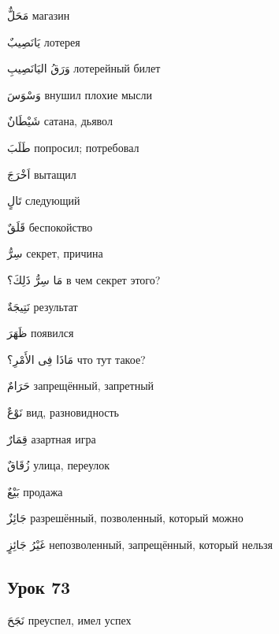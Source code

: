 \documentclass[a5paper]{article}
\newcommand\textstyleDropCaps[1]{#1}
\newcommand\textstyleCaptioncharacters[1]{#1}
\begin{document}
\textstyleCaptioncharacters{مَحَلٌّ }\textstyleDropCaps{магазин‎}

\textstyleCaptioncharacters{يَانَصِيبٌ }\textstyleDropCaps{лотерея‎}

\textstyleCaptioncharacters{وَرَقُ اليَانَصِيبِ }\textstyleDropCaps{ло­терейный билет‎}

\textstyleCaptioncharacters{وَسْوَسَ }\textstyleDropCaps{внушил плохие мысли‎}

\textstyleCaptioncharacters{شَيْطَانٌ }\textstyleDropCaps{сатана, дьявол‎}

\textstyleCaptioncharacters{طَلَبَ }\textstyleDropCaps{попросил; потребо­вал‎}

\textstyleCaptioncharacters{اَخْرَجَ }\textstyleDropCaps{вытащил‎}

\textstyleCaptioncharacters{تَالٍ }\textstyleDropCaps{следующий‎}

\textstyleCaptioncharacters{قَلَقٌ }\textstyleDropCaps{беспокойство‎}

\textstyleCaptioncharacters{سِرُّ }\textstyleDropCaps{секрет, причина‎}

\textstyleCaptioncharacters{مَا سِرُّ ذَلِكَ؟ }\textstyleDropCaps{в чем се­крет этого?‎}

\textstyleCaptioncharacters{نَتِيجَةٌ }\textstyleDropCaps{результат‎}

\textstyleCaptioncharacters{ظَهَرَ }\textstyleDropCaps{появился‎}

\textstyleCaptioncharacters{مَاذَا فِى الأَمْرِ؟ }\textstyleDropCaps{что тут такое?‎}

\textstyleCaptioncharacters{حَرَامٌ }\textstyleDropCaps{запрещённый, запретный‎}

\textstyleCaptioncharacters{نَوْعٌ }\textstyleDropCaps{вид, разновидность‎}

\textstyleCaptioncharacters{قِمَارٌ }\textstyleDropCaps{азартная игра‎}

\textstyleCaptioncharacters{زُقَاقٌ }\textstyleDropCaps{улица, переулок‎}

\textstyleCaptioncharacters{بَيْعٌ }\textstyleDropCaps{продажа‎}

\textstyleCaptioncharacters{جَائِزٌ }\textstyleDropCaps{разрешённый, поз­воленный, который можно‎}

\textstyleCaptioncharacters{غَيْرُ جَائِزٍ }\textstyleDropCaps{непозволен­ный, запрещённый, который нельзя‎}

\subsection[Урок 73‎]{\textstyleDropCaps{Урок 73‎}}
\textstyleCaptioncharacters{نَجَحَ }\textstyleDropCaps{преуспел, имел успех‎}
\end{document}

